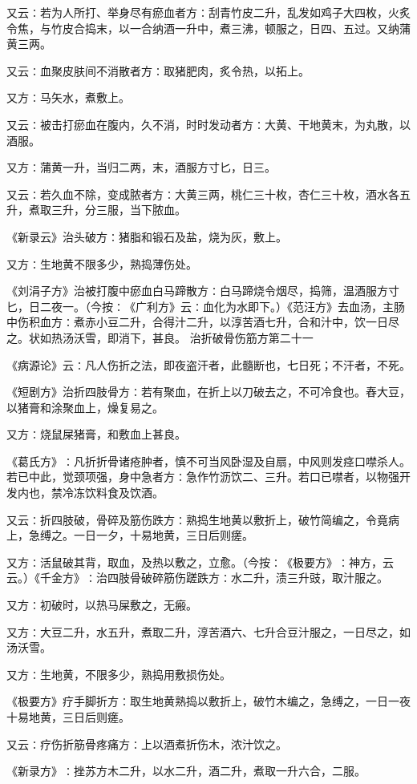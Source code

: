 \documentclass[a4paper,12pt,UTF8,twoside]{ctexbook}
\begin{document}
又云∶若为人所打、举身尽有瘀血者方∶刮青竹皮二升，乱发如鸡子大四枚，火炙令焦，与竹皮合捣末，以一合纳酒一升中，煮三沸，顿服之，日四、五过。又纳蒲黄三两。

又云∶血聚皮肤间不消散者方∶取猪肥肉，炙令热，以拓上。

又方∶马矢水，煮敷上。

又云∶被击打瘀血在腹内，久不消，时时发动者方∶大黄、干地黄末，为丸散，以酒服。

又方∶蒲黄一升，当归二两，末，酒服方寸匕，日三。

又云∶若久血不除，变成脓者方∶大黄三两，桃仁三十枚，杏仁三十枚，酒水各五升，煮取三升，分三服，当下脓血。

《新录云》治头破方∶猪脂和锻石及盐，烧为灰，敷上。

又方∶生地黄不限多少，熟捣薄伤处。

《刘涓子方》治被打腹中瘀血白马蹄散方∶白马蹄烧令烟尽，捣筛，温酒服方寸匕，日二夜一。（今按∶《广利方》云∶血化为水即下。）《范汪方》去血汤，主肠中伤积血方∶煮赤小豆二升，合得汁二升，以淳苦酒七升，合和汁中，饮一日尽之。状如热汤沃雪，即消下，甚良。
治折破骨伤筋方第二十一

《病源论》云∶凡人伤折之法，即夜盗汗者，此髓断也，七日死；不汗者，不死。

《短剧方》治折四肢骨方∶若有聚血，在折上以刀破去之，不可冷食也。舂大豆，以猪膏和涂聚血上，燥复易之。

又方∶烧鼠屎猪膏，和敷血上甚良。

《葛氏方》∶凡折折骨诸疮肿者，慎不可当风卧湿及自扇，中风则发痉口噤杀人。若已中此，觉颈项强，身中急者方∶急作竹沥饮二、三升。若口已噤者，以物强开发内也，禁冷冻饮料食及饮酒。

又云∶折四肢破，骨碎及筋伤跌方∶熟捣生地黄以敷折上，破竹简编之，令竟病上，急缚之。一日一夕，十易地黄，三日后则瘥。

又方∶活鼠破其背，取血，及热以敷之，立愈。（今按∶《极要方》∶神方，云云。）《千金方》∶治四肢骨破碎筋伤蹉跌方∶水二升，渍三升豉，取汁服之。

又方∶初破时，以热马屎敷之，无瘢。

又方∶大豆二升，水五升，煮取二升，淳苦酒六、七升合豆汁服之，一日尽之，如汤沃雪。

又方∶生地黄，不限多少，熟捣用敷损伤处。

《极要方》疗手脚折方∶取生地黄熟捣以敷折上，破竹木编之，急缚之，一日一夜十易地黄，三日后则瘥。

又云∶疗伤折筋骨疼痛方∶上以酒煮折伤木，浓汁饮之。

《新录方》∶挫苏方木二升，以水二升，酒二升，煮取一升六合，二服。
\end{document}
